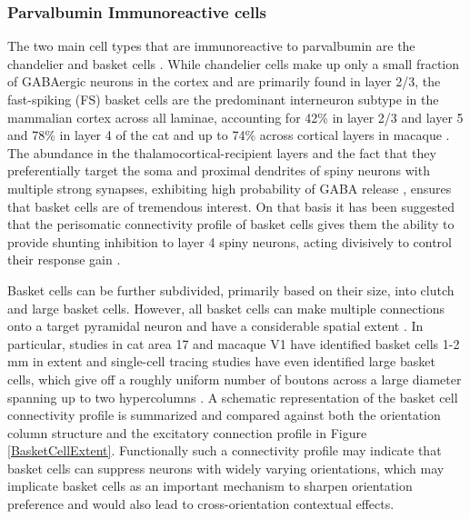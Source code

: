 \subsubsection{Parvalbumin Immunoreactive cells}

The two main cell types that are immunoreactive to parvalbumin are the
chandelier and basket cells \citep{Binzegger2004}. While chandelier
cells make up only a small fraction of GABAergic neurons in the cortex
and are primarily found in layer 2/3, the fast-spiking (FS) basket
cells are the predominant interneuron subtype in the mammalian cortex
across all laminae, accounting for 42\% in layer 2/3 and layer 5 and
78\% in layer 4 of the cat \citep{Hogan1992,Huxlin2001} and up to 74\%
across cortical layers in macaque \citep{VanBrederode1990}. The
abundance in the thalamocortical-recipient layers and the fact that
they preferentially target the soma and proximal dendrites of spiny
neurons with multiple strong synapses, exhibiting high probability of
GABA release \citep{Freund2007,Markram2004}, ensures that basket cells
are of tremendous interest. On that basis it has been suggested that
the perisomatic connectivity profile of basket cells gives them the
ability to provide shunting inhibition to layer 4 spiny neurons,
acting divisively to control their response gain \citep{Wilson2012}.

Basket cells can be further subdivided, primarily based on their size,
into clutch and large basket cells. However, all basket cells can make
multiple connections onto a target pyramidal neuron
\citep{Somogyi1983} and have a considerable spatial extent
\citep{Kisvarday2002}. In particular, studies in cat area 17 and
macaque V1 have identified basket cells 1-2 mm in extent
\citep{Somogyi1983,Lund1987,Lund1991,Martin1983} and single-cell
tracing studies have even identified large basket cells, which give
off a roughly uniform number of boutons across a large diameter
spanning up to two hypercolumns \citep{Buzas2001}. A schematic
representation of the basket cell connectivity profile is summarized
and compared against both the orientation column structure and the
excitatory connection profile in Figure
\ref{BasketCellExtent}. Functionally such a connectivity profile may
indicate that basket cells can suppress neurons with widely varying
orientations, which may implicate basket cells as an important
mechanism to sharpen orientation preference and would also lead to
cross-orientation contextual effects.

